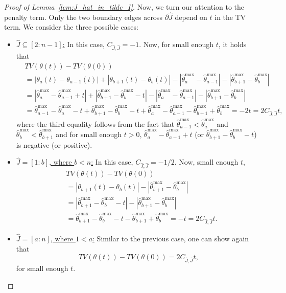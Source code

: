 \documentclass[11pt]{article}
\theoremstyle{plain}
\theoremstyle{definition}
\theoremstyle{remark}
\begin{document}
\begin{appendix}
\begin{proof}[Proof of Lemma~\ref{lem:J_hat_in_tilde_I}]
Now, we turn our attention to the penalty term. Only the two boundary edges across $\partial \hat{J}$ depend on $t$ in the TV term. We consider the three possible cases:
\begin{itemize}
    \item \underline{$\hat{J}\subseteq [2:n-1]$:} In this case, $C_{\hat{J},\hat{J}}=-1$. Now, for small enough $t$, it holds that
    \begin{align*}
        &TV(\theta(t))-TV(\theta(0))\\
        &=|\theta_a(t)-\theta_{a-1}(t)|+|\theta_{b+1}(t)-\theta_b(t)|-|\hat{\theta}^{\max}_a-\hat{\theta}^{\max}_{a-1}|-|\hat{\theta}^{\max}_{b+1}-\hat{\theta}^{\max}_b|\\
        &=|\hat\theta^{\max}_a-\hat\theta^{\max}_{a-1}+t|+|\hat\theta^{\max}_{b+1}-\hat\theta^{\max}_b-t|-|\hat{\theta}^{\max}_a-\hat{\theta}^{\max}_{a-1}|-|\hat{\theta}^{\max}_{b+1}-\hat{\theta}^{\max}_b|\\
        &=\hat\theta^{\max}_{a-1}-\hat\theta^{\max}_a-t+\hat\theta^{\max}_{b+1}-\hat\theta^{\max}_b-t+\hat{\theta}^{\max}_a-\hat{\theta}^{\max}_{a-1}-\hat{\theta}^{\max}_{b+1}+\hat{\theta}^{\max}_b=-2t=2C_{\hat{J},\hat{J}}t,
    \end{align*}
    where the third equality follows from the fact that $\hat{\theta}^{\max}_{a-1}<\hat{\theta}^{\max}_{a}$ and $\hat{\theta}^{\max}_{b}<\hat{\theta}^{\max}_{b+1}$ and for small enough $t>0$, $\hat\theta^{\max}_a-\hat\theta^{\max}_{a-1}+t$ (or $\hat\theta^{\max}_{b+1}-\hat\theta^{\max}_b-t$) is negative (or positive). 
   \item \underline{$\hat{J}=[1:b]$, where $b<n$:} In this case, $C_{\hat{J},\hat{J}}=-1/2$. Now, small enough $t$,
   \begin{align*}
        &TV(\theta(t))-TV(\theta(0))\\
        &=|\theta_{b+1}(t)-\theta_b(t)|-|\hat{\theta}^{\max}_{b+1}-\hat{\theta}^{\max}_b|\\
        &=|\hat\theta^{\max}_{b+1}-\hat\theta^{\max}_b-t|-|\hat{\theta}^{\max}_{b+1}-\hat{\theta}^{\max}_b|\\
        &=\hat\theta^{\max}_{b+1}-\hat\theta^{\max}_b-t-\hat{\theta}^{\max}_{b+1}+\hat{\theta}^{\max}_b=-t=2C_{\hat{J},\hat{J}}t.
    \end{align*}
    \item \underline{$\hat{J}=[a:n]$, where $1<a$:} Similar to the previous case, one can show again that
    \[TV(\theta(t))-TV(\theta(0))=2C_{\hat{J},\hat{J}}t,\]
    for small enough $t$.
\end{itemize}

\end{proof}
\end{appendix}
\end{document}
